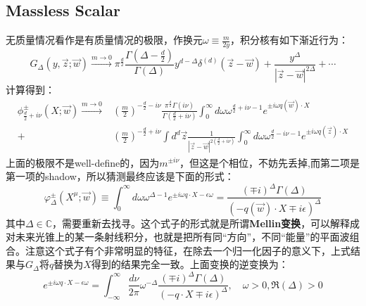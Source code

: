 \subsection{Massless Scalar}
无质量情况看作是有质量情况的极限，作换元$\omega\equiv\frac{m}{2y}$，积分核有如下渐近行为：
\begin{equation}
	G_{\Delta}(y,\vec{z};\vec{w})\xrightarrow{m\to0}\pi^{\frac{d}{2}}\frac{\Gamma(\Delta-\frac{d}{2})}{\Gamma(\Delta)}y^{d-\Delta}\delta^{(d)}(\vec{z}-\vec{w})+\frac{y^{\Delta}}{|\vec{z}-\vec{w}|^{2\Delta}}+\cdots 
\end{equation}
计算得到：
\begin{equation}
	\begin{aligned}\phi_{\frac{d}{2}+i\nu}^{\pm}(X;\vec{w})\xrightarrow{m\to0}&\left(\frac{m}{2}\right)^{-\frac{d}{2}-i\nu}\frac{\pi^{\frac{d}{2}}\Gamma(i\nu)}{\Gamma(\frac{d}{2}+i\nu)}\int_{0}^{\infty}d\omega\omega^{\frac{d}{2}+i\nu-1}e^{\pm i\omega q(\vec{w})\cdot X}\\+&\left(\frac{m}{2}\right)^{-\frac{d}{2}+i\nu}\int d^{d}\vec{z}\frac{1}{|\vec{z}-\vec{w}|^{2(\frac{d}{2}+i\nu)}}\int_{0}^{\infty}d\omega\omega^{\frac{d}{2}-i\nu-1}e^{\pm i\omega q(\vec{z})\cdot X}\end{aligned}
\end{equation}
上面的极限不是well-define的，因为$m^{\pm i\nu}$，但这是个相位，不妨先丢掉,而第二项是第一项的shadow，所以猜测最终应该是下面的形式：
\begin{equation}
	\boxed{\varphi_\Delta^\pm(X^\mu;\vec w)\equiv\int_0^\infty d\omega\omega^{\Delta-1}e^{\pm i\omega q\cdot X-\epsilon\omega}=\frac{(\mp i)^\Delta\Gamma(\Delta)}{(-q(\vec w)\cdot X\mp i\epsilon)^\Delta}}
\end{equation}
其中$\Delta\in\mathbb{C}$，需要重新去找寻。这个式子的形式就是所谓\textbf{Mellin变换}，可以解释成对未来光锥上的某一条射线积分，也就是把所有同“方向”，不同“能量”的平面波组合。注意这个式子有个非常明显的特征，在除去一个归一化因子的意义下，上式结果与$G_\Delta$将$q$替换为$X$得到的结果完全一致。上面变换的逆变换为：
\begin{equation}
	e^{\pm i\omega q\cdot X-\epsilon\omega}=\int_{-\infty}^{\infty}\frac{d\nu}{2\pi}\omega^{-\Delta}\frac{(\mp i)^{\Delta}\Gamma(
		\Delta)}{(-q\cdot X\mp i\epsilon)^{\Delta}},\quad\omega>0,\Re(\Delta)>0
\end{equation}
